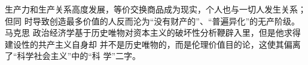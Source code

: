 

生产力和生产关系高度发展，等价交换商品成为现实，个人也与一切人发生关系；但同
时导致创造最多价值的人反而沦为“没有财产的”、“普遍异化”的无产阶级。马克思
政治经济学基于历史唯物对资本主义的破坏性分析鞭辟入里，但是他求得建设性的共产主义自身却
并不是历史唯物的，而是伦理价值目的论，这使其偏离了“科学社会主义”中的“科
学”二字。


